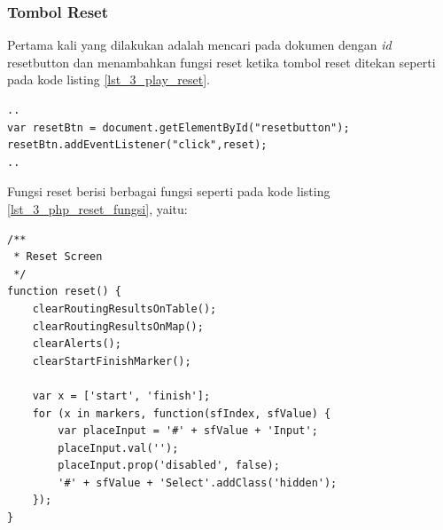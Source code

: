 \subsubsection{Tombol Reset}
Pertama kali yang dilakukan adalah mencari pada dokumen dengan \textit{id} resetbutton dan menambahkan fungsi reset ketika tombol reset ditekan seperti pada kode listing \ref{lst_3_play_reset}. 

\begin{lstlisting}[caption=\textit{Method} untuk memanggil fungsi JavaScript ketika tombol \textit{reset} ditekan ,label = {lst_3_play_reset}]
..
var resetBtn = document.getElementById("resetbutton");
resetBtn.addEventListener("click",reset);
..
\end{lstlisting}

Fungsi reset berisi berbagai fungsi seperti pada kode listing \ref{lst_3_php_reset_fungsi}, yaitu:

\begin{lstlisting}[caption=Fungsi JavaScript reset ,label = {lst_3_play_reset_fungsi}]	
/**
 * Reset Screen
 */
function reset() {
    clearRoutingResultsOnTable();
    clearRoutingResultsOnMap();
    clearAlerts();
    clearStartFinishMarker();

    var x = ['start', 'finish'];
    for (x in markers, function(sfIndex, sfValue) {
        var placeInput = '#' + sfValue + 'Input';
        placeInput.val('');
        placeInput.prop('disabled', false);
        '#' + sfValue + 'Select'.addClass('hidden');
    });
}
\end{lstlisting}


